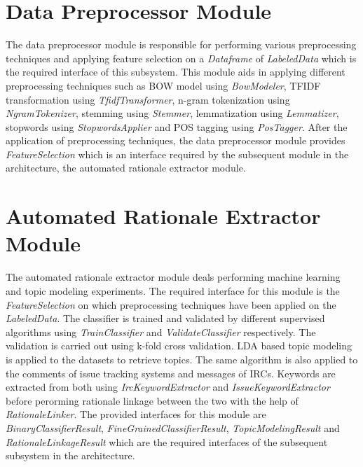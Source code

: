 \documentclass[a4paper,12pt,twoside]{report}
\begin{document}
\section{Data Preprocessor Module}
The data preprocessor module is responsible for performing various preprocessing techniques and applying feature selection on a \textit{Dataframe} of \textit{LabeledData} which is the required interface of this subsystem. This module aids in applying different preprocessing techniques such as \acs{BOW} model using \textit{BowModeler}, \acs{TFIDF} transformation using \textit{TfidfTransformer}, n-gram tokenization using \textit{NgramTokenizer}, stemming using \textit{Stemmer}, lemmatization using \textit{Lemmatizer}, stopwords using \textit{StopwordsApplier} and \acs{POS} tagging using \textit{PosTagger}. After the application of preprocessing techniques, the data preprocessor module provides \textit{FeatureSelection} which is an interface required by the subsequent module in the architecture, the automated rationale extractor module. 

\section{Automated Rationale Extractor Module}
The automated rationale extractor module deals performing machine learning and topic modeling experiments. The required interface for this module is the \textit{FeatureSelection} on which preprocessing techniques have been applied on the \textit{LabeledData}. The classifier is trained and validated by different supervised algorithms using \textit{TrainClassifier} and \textit{ValidateClassifier} respectively. The validation is carried out using k-fold cross validation. \acs{LDA} based topic modeling is applied to the datasets to retrieve topics. The same algorithm is also applied to the comments of issue tracking systems and messages of \acs{IRC}s. Keywords are extracted from both using \textit{IrcKeywordExtractor} and \textit{IssueKeywordExtractor} before perorming rationale linkage between the two with the help of \textit{RationaleLinker}. The provided interfaces for this module are \textit{BinaryClassifierResult}, \textit{FineGrainedClassifierResult}, \textit{TopicModelingResult} and \textit{RationaleLinkageResult} which are the required interfaces of the subsequent subsystem in the architecture. 
\end{document}
